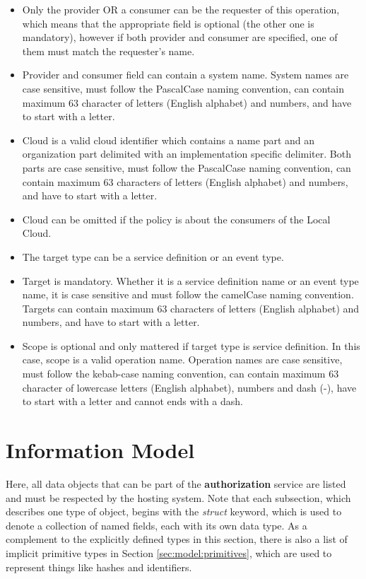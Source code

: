 \documentclass[a4paper]{arrowhead}
\begin{document}
\begin{itemize}
    \item Only the provider OR a consumer can be the requester of this operation, which means that the appropriate field is optional (the other one is mandatory), however if both provider and consumer are specified, one of them must match the requester's name.
    \item Provider and consumer field can contain a system name. System names are case sensitive, must follow the PascalCase naming convention, can contain maximum 63 character of letters (English alphabet) and numbers, and have to start with a letter.
    \item Cloud is a valid cloud identifier which contains a name part and an organization part delimited with an implementation specific delimiter. Both parts are case sensitive, must follow the PascalCase naming convention, can contain maximum 63 characters of letters (English alphabet) and numbers, and have to start with a letter.
    \item Cloud can be omitted if the policy is about the consumers of the Local Cloud. 
    \item The target type can be a service definition or an event type. 
    \item Target is mandatory. Whether it is a service definition name or an event type name, it is case sensitive and must follow the camelCase naming convention. Targets can contain maximum 63 characters of letters (English alphabet) and numbers, and have to start with a letter.
    \item Scope is optional and only mattered if target type is service definition. In this case, 
    scope is a valid operation name. Operation names are case sensitive, must follow the kebab-case naming convention, can contain maximum 63 character of lowercase letters (English alphabet), numbers and dash (-), have to start with a letter and cannot ends with a dash.
\end{itemize}

\clearpage

\section{Information Model}
\label{sec:model}

Here, all data objects that can be part of the \textbf{authorization} service are listed and must be respected by the hosting system.
Note that each subsection, which describes one type of object, begins with the \textit{struct} keyword, which is used to denote a collection of named fields, each with its own data type.
As a complement to the explicitly defined types in this section, there is also a list of implicit primitive types in Section \ref{sec:model:primitives}, which are used to represent things like hashes and identifiers.
\end{document}
